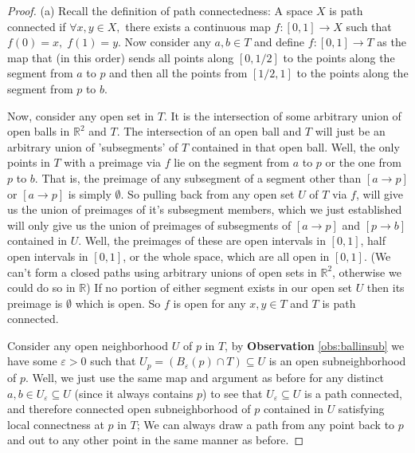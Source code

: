 \documentclass[addpoints,10pt]{exam}
\theoremstyle{plain}
\theoremstyle{definition}
\theoremstyle{plain}
\theoremstyle{definition}
\newcommand{\RR}{\ensuremath{\mathbb{R}}}
\begin{document}
\begin{proof}
(a) Recall the definition of path connectedness: A space $X$ is path connected if $\forall x,y\in X,$ there exists a continuous map $f:[0,1]\to X$ such that $f(0)=x,\;f(1)=y.$  Now consider any $a,b\in T$ and define $f:[0,1]\to T$ as the map that (in this order) sends all points along $[0,1/2]$ to the points along the segment from $a$ to $p$ and then all the points from $[1/2,1]$ to the points along the segment from $p$ to $b$. 

Now, consider any open set in $T$. It is the intersection of some arbitrary union of open balls in $\RR^{2}$ and $T$. The intersection of an open ball and $T$ will just be an arbitrary union of 'subsegments' of $T$ contained in that open ball. 
Well, the only points in $T$ with a preimage via $f$ lie on the segment from $a$ to $p$ or the one from $p$ to $b$. That is, the preimage of any subsegment of a segment other than $[a\to p]$ or $[a\to p]$ is simply $\emptyset$. So pulling back from any open set $U$ of $T$ via $f$, will give us the union of preimages of it's subsegment members, which we just established will only give us the union of preimages of subsegments of $[a\to p]$ and $[p\to b]$ contained in $U.$ Well, the preimages of these are open intervals in $[0,1]$, half open intervals in $[0,1]$, or the whole space, which are all open in $[0,1]$. (We can't form a closed paths using arbitrary unions of open sets in $\RR^{2}$, otherwise we could do so in $\RR$) If no portion of either segment exists in our open set $U$ then its preimage is $\emptyset$ which is open. So $f$ is open for any $x,y\in T$ and $T$ is path connected.

Consider any open neighborhood $U$ of $p$ in $T$, by \textbf{Observation }\ref{obs:ballinsub} we have some $\varepsilon>0$ such that $U_{p}=(B_{\varepsilon}(p)\cap T)\subseteq U$ is an open subneighborhood of $p.$ Well, we just use the same map and argument as before for any distinct $a,b\in U_{\varepsilon}\subseteq U$ (since it always contains $p$) to see that $U_{\varepsilon}\subseteq U$ is a path connected, and therefore connected open subneighborhood of $p$ contained in $U$ satisfying local connectness at $p$ in $T$; We can always draw a path from any point back to $p$ and out to any other point in the same manner as before.


\end{proof}
\end{document}
